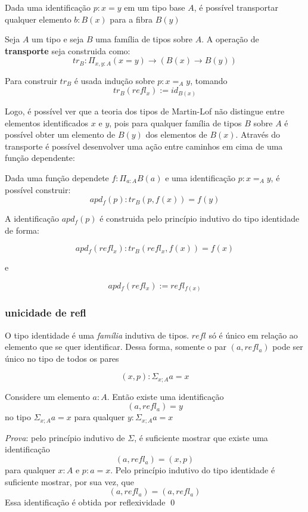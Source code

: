 \documentclass[../main.tex]{subfiles}
\begin{document}
Dada uma identificação $p : x = y$ em um tipo base $A$, é possível transportar qualquer elemento $b : B(x)$ para a fibra $B(y)$

\begin{definition}
    Seja $A$ um tipo e seja $B$ uma família de tipos sobre $A$. A operação de \textbf{transporte} seja construida como:
    $$tr_B : \Pi_{x, y : A}(x = y) \to (B(x) \to B(y))$$
\end{definition}

Para construir $tr_B$ é usada indução sobre $p : x =_A y$, tomando
$$tr_B (refl_x) := id_{B(x)}$$

Logo, é possível ver que a teoria dos tipos de Martin-Lof não distingue entre elementos identificados $x$ e $y$, pois para qualquer família de tipos $B$ sobre $A$ é possível obter um elemento de $B(y)$ dos elementos de $B(x)$. Através do transporte é possível desenvolver uma ação entre caminhos em cima de uma função dependente:

\begin{definition}
    Dada uma função dependete $f : \Pi_{a : A} B(a)$ e uma identificação $p : x =_A y$, é possível construir:
    $$apd_f(p) : tr_B(p, f(x)) = f(y)$$
\end{definition}

A identificação $apd_f(p)$ é construida pelo princípio indutivo do tipo identidade de forma:

$$apd_f(refl_x) : tr_B(refl_x, f(x)) = f(x)$$

e

$$apd_f(refl_x) := refl_{f(x)}$$

\subsubsection{unicidade de refl}

O tipo identidade é uma \emph{família} indutiva de tipos. $refl$ só é único em relação ao elemento que se quer identificar. Dessa forma, somente o par $(a, refl_a)$ pode ser único no tipo de todos os pares

$$(x, p) : \Sigma_{x ; A} a = x$$

\begin{proposition}
    Considere um elemento $a : A$. Então existe uma identificação
    $$(a, refl_a) = y$$
    no tipo $\Sigma_{x ; A} a = x$ para qualquer $y : \Sigma_{x ; A} a = x$
\end{proposition}

\emph{Prova}: pelo princípio indutivo de $\Sigma$, é suficiente mostrar que existe uma identificação $$(a, refl_a) = (x, p)$$ para qualquer $x : A$ e $p : a = x$. Pelo princípio indutivo do tipo identidade é suficiente mostrar, por sua vez, que
$$(a, refl_a) = (a, refl_a)$$
Essa identificação é obtida por reflexividade \qed
\end{document}
